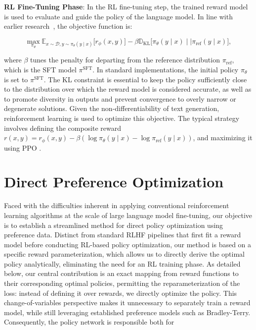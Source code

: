 \textbf{RL Fine-Tuning Phase}: In the RL fine-tuning step, the trained reward model is used to evaluate and guide the policy of the language model. In line with earlier research~\citep{jaques2017sequence, jaques2020human}, the objective function is:

\begin{equation}\label{eq:RL}
\max_{\pi_{\theta}}  \mathbb{E}_{x\sim \mathcal{D}, y\sim \pi_{\theta}(y \mid x)}\bigl[r_{\phi}(x, y)\bigr] - \beta\mathbb{D}_{\textrm{KL}}\bigl[\pi_{\theta}(y\mid x)\mid \mid \pi_\text{ref}(y\mid x)\bigr],
\end{equation}

where $\beta$ tunes the penalty for departing from the reference distribution $\pi_\text{ref}$, which is the SFT model $\pi^\text{SFT}$. In standard implementations, the initial policy $\pi_\theta$ is set to $\pi^\text{SFT}$. The KL constraint is essential to keep the policy sufficiently close to the distribution over which the reward model is considered accurate, as well as to promote diversity in outputs and prevent convergence to overly narrow or degenerate solutions. Given the non-differentiability of text generation, reinforcement learning is used to optimize this objective. The typical strategy \citep{ziegler2020finetuning, stiennon2022learning, bai2022training, ouyang2022training} involves defining the composite reward ${r(x, y) = r_{\phi}(x, y) -\beta (\log \pi_{\theta}(y\mid x) - \log \pi_\text{ref}(y\mid x))}$, and maximizing it using PPO \cite{schulman2017proximal}.

\section{Direct Preference Optimization}\label{sec:DPO}

Faced with the difficulties inherent in applying conventional reinforcement learning algorithms at the scale of large language model fine-tuning, our objective is to establish a streamlined method for direct policy optimization using preference data. Distinct from standard RLHF pipelines that first fit a reward model before conducting RL-based policy optimization, our method is based on a specific reward parameterization, which allows us to directly derive the optimal policy analytically, eliminating the need for an RL training phase. As detailed below, our central contribution is an exact mapping from reward functions to their corresponding optimal policies, permitting the reparameterization of the loss: instead of defining it over rewards, we directly optimize the policy. This change-of-variables perspective makes it unnecessary to separately train a reward model, while still leveraging established preference models such as Bradley-Terry. Consequently, the policy network is responsible both for

